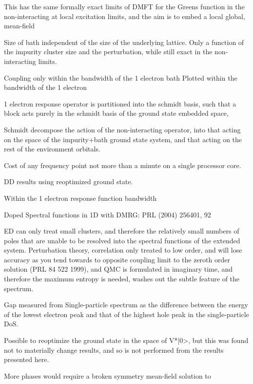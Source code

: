 \documentclass[aps,showpacs,twocolumn,nobibnotes]{revtex4}
\begin{document}
This has the same formally
exact limits of DMFT for the Greens function in the non-interacting at local excitation limits, and the aim is to embed a local global, mean-field 

Size of bath independent of the size of the underlying lattice. Only a function of the impurity cluster size and the perturbation, while still exact in the non-interacting limits.

Coupling only within the bandwidth of the 1 electron bath
Plotted within the bandwidth of the 1 electron 

1 electron response operator is partitioned into the schmidt basis, such that a block acts purely in the schmidt basis of the ground state embedded space, 

Schmidt decompose the action of the non-interacting operator, into that acting on the space of the impurity+bath ground state system, and that acting on the rest of the environment orbitals.

Cost of any frequency point not more than a minute on a single processor core.

DD results using reoptimized ground state.

Within the 1 electron response function bandwidth

Doped Spectral functions in 1D with DMRG: PRL (2004) 256401, 92

ED can only treat small clusters, and therefore the relatively small numbers of poles that are unable to be resolved into the spectral functions of the extended system. Perturbation theory, 
correlation only treated to low order, and will 
lose accuracy as you tend towards to opposite coupling limit to the zeroth order solution (PRL 84 522 1999), and QMC is formulated in imaginary time, and therefore the maximum entropy is needed,
washes out the subtle feature of the spectrum.


Gap measured from Single-particle spectrum as the difference between the energy of the lowest electron peak and that of the highest hole peak in the single-particle DoS.

Possible to reoptimize the ground state in the space of V*|0>, but this was found not to materially change results, and so is not performed from the results presented here.

More phases would require a broken symmetry mean-field solution to 
\end{document}
